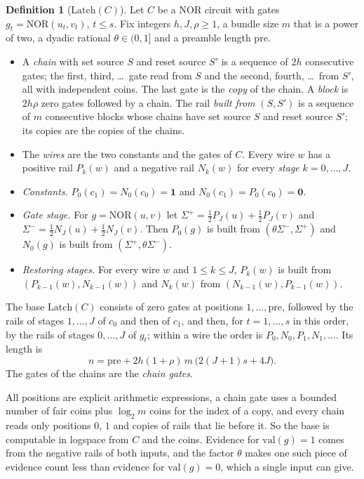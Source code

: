 \documentclass[11pt]{amsart}
\theoremstyle{definition}
\newtheorem{definition}[theorem]{Definition}
\theoremstyle{remark}
\newcommand{\NOR}{\mathrm{NOR}}
\newcommand{\val}{\mathrm{val}}
\begin{document}
\begin{definition}[$\mathrm{Latch}(C)$]\label{def:latch}
Let $C$ be a NOR circuit with gates $g_t=\NOR(u_t,v_t)$, $t\le s$. Fix integers $h,J,\rho\ge1$, a
bundle size $m$ that is a power of two, a dyadic rational $\theta\in(0,1]$ and a preamble length
$\mathrm{pre}$.
\begin{itemize}[leftmargin=2em]
\item A \emph{chain} with set source $S$ and reset source $S'$ is a sequence of $2h$ consecutive
gates; the first, third, \dots\ gate read from $S$ and the second, fourth, \dots\ from $S'$, all with
independent coins. The last gate is the \emph{copy} of the chain. A \emph{block} is $2h\rho$ zero
gates followed by a chain. The rail \emph{built from} $(S,S')$ is a sequence of $m$ consecutive
blocks whose chains have set source $S$ and reset source $S'$; its copies are the copies of the
chains.
\item The \emph{wires} are the two constants and the gates of $C$. Every wire $w$ has a positive
rail $P_k(w)$ and a negative rail $N_k(w)$ for every \emph{stage} $k=0,\dots,J$.
\item \emph{Constants.} $P_0(c_1)=N_0(c_0)=\mathbf 1$ and $N_0(c_1)=P_0(c_0)=\mathbf 0$.
\item \emph{Gate stage.} For $g=\NOR(u,v)$ let $\Sigma^+=\frac12P_J(u)+\frac12P_J(v)$ and
$\Sigma^-=\frac12N_J(u)+\frac12N_J(v)$. Then $P_0(g)$ is built from $(\theta\Sigma^-,\Sigma^+)$ and
$N_0(g)$ is built from $(\Sigma^+,\theta\Sigma^-)$.
\item \emph{Restoring stages.} For every wire $w$ and $1\le k\le J$, $P_k(w)$ is built from
$(P_{k-1}(w),N_{k-1}(w))$ and $N_k(w)$ from $(N_{k-1}(w),P_{k-1}(w))$.
\end{itemize}
The base $\mathrm{Latch}(C)$ consists of zero gates at positions $1,\dots,\mathrm{pre}$, followed
by the rails of stages $1,\dots,J$ of $c_0$ and then of $c_1$, and then, for $t=1,\dots,s$ in
this order, by the rails of stages $0,\dots,J$ of $g_t$; within a wire the order is
$P_0,N_0,P_1,N_1,\dots$. Its length is
\[
n=\mathrm{pre}+2h(1+\rho)\,m\,\bigl(2(J+1)s+4J\bigr).
\]
The gates of the chains are the \emph{chain gates}.
\end{definition}

All positions are explicit arithmetic expressions, a chain gate uses a bounded number of fair
coins plus $\log_2m$ coins for the index of a copy, and every chain reads only positions $0$, $1$
and copies of rails that lie before it. So the base is computable in logspace from $C$ and the
coins. Evidence for $\val(g)=1$ comes from the negative rails of both inputs, and the factor
$\theta$ makes one such piece of evidence count less than evidence for $\val(g)=0$, which a
single input can give.
\end{document}
